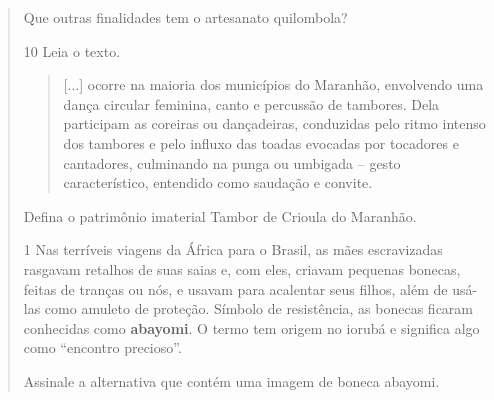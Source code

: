 \begin{escolha}
\begin{quote}
\begin{escolha}
\item Que outras finalidades tem o artesanato quilombola?
\end{escolha}

\num{10} Leia o texto.
%


\begin{quote}
{[}...{]} ocorre na maioria dos municípios do
Maranhão, envolvendo uma dança circular feminina, canto e percussão de
tambores. Dela participam as coreiras ou dançadeiras, conduzidas pelo
ritmo intenso dos tambores e pelo influxo das toadas evocadas por
tocadores e cantadores, culminando na punga ou umbigada -- gesto
característico, entendido como saudação e convite.

\end{quote}

Defina o patrimônio imaterial Tambor de Crioula do Maranhão.




\num{1}  Nas terríveis viagens da África para o Brasil, as mães escravizadas
rasgavam retalhos de suas saias e, com eles, criavam pequenas bonecas, feitas
de tranças ou nós, e usavam para acalentar seus filhos, além de usá-las como
amuleto de proteção. Símbolo de resistência, as bonecas ficaram conhecidas
como \textbf{abayomi}. O termo tem origem no iorubá e significa algo como
``encontro precioso''.

Assinale a alternativa que contém uma imagem de boneca abayomi.
%
%
%
%
%
%


\end{quote}
\end{escolha}
